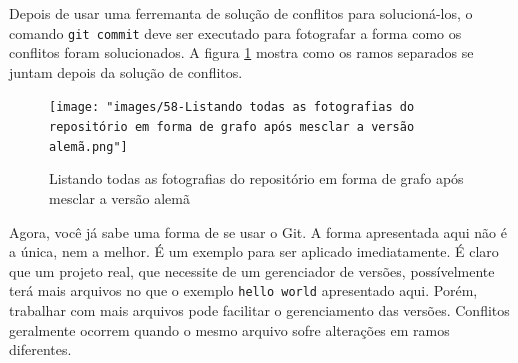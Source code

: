 \documentclass[a4paper]{book}
\begin{document}
Depois de usar uma ferremanta de solução de conflitos
para solucioná-los, o comando \texttt{git commit}
deve ser executado para fotografar a forma como
os conflitos foram solucionados.
%
A figura \ref{fig:58} mostra como os ramos separados 
se juntam depois da solução de conflitos.

\begin{figure}[h!]
\caption{Listando todas as fotografias do repositório em forma de grafo após mesclar a versão alemã}
\label{fig:58}
\centering
\texttt{[image: "images/58-Listando todas as fotografias do repositório em forma de grafo após mesclar a versão alemã.png"]}
\end{figure}

Agora, você já sabe uma forma de se usar o Git.
A forma apresentada aqui não é a única, nem a melhor. 
É um exemplo para ser aplicado imediatamente.
É claro que um projeto real, que necessite de um
gerenciador de versões, possívelmente terá mais arquivos
no que o exemplo \texttt{hello world} apresentado aqui.
Porém, trabalhar com mais arquivos pode facilitar o
gerenciamento das versões.
Conflitos geralmente ocorrem quando o mesmo arquivo
sofre alterações em ramos diferentes.





\end{document}
